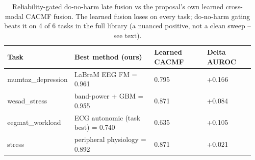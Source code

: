 \begin{table}[t]
\centering
\caption{Reliability-gated do-no-harm late fusion vs the proposal's own learned cross-modal CACMF fusion. The learned fusion loses on every task; do-no-harm gating beats it on 4 of 6 tasks in the full library (a nuanced positive, not a clean sweep -- see text).}
\label{tab:fusion}
\begin{tabular}{llll}
\toprule
Task & Best method (ours) & Learned CACMF & Delta AUROC \\
\midrule
mumtaz\_depression & LaBraM EEG FM = 0.961 & 0.795 & +0.166 \\
wesad\_stress & band-power + GBM = 0.955 & 0.871 & +0.084 \\
eegmat\_workload & ECG autonomic (task best) = 0.740 & 0.635 & +0.105 \\
stress & peripheral physiology = 0.892 & 0.871 & +0.021 \\
\bottomrule
\end{tabular}
\end{table}

